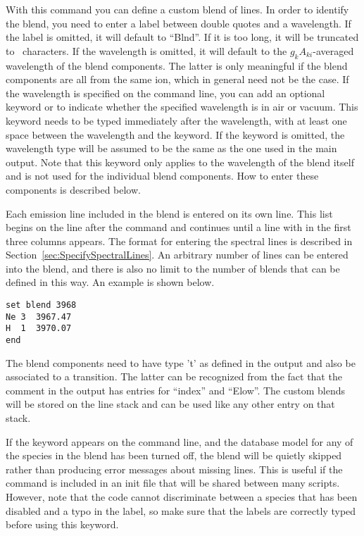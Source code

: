 With this command you can define a custom blend of lines. In order to identify
the blend, you need to enter a label between double quotes and a wavelength.
If the label is omitted, it will default to ``Blnd''. If it is too long, it
will be truncated to \LabelLenMax\ characters. If the wavelength is omitted,
it will default to the $g_k A_{ki}$-averaged wavelength of the blend
components. The latter is only meaningful if the blend components are all from
the same ion, which in general need not be the case. If the wavelength is
specified on the command line, you can add an optional keyword 
or  to indicate whether the specified wavelength is in air
or vacuum. This keyword needs to be typed immediately after the wavelength,
with at least one space between the wavelength and the keyword. If the keyword
is omitted, the wavelength type will be assumed to be the same as the one used
in the main output. Note that this keyword only applies to the wavelength of
the blend itself and is not used for the individual blend components. How to
enter these components is described below.

Each emission line included in the blend is entered on its own line. This list
begins on the line after the  command and continues until
a line with  in the first three columns appears. The format for
entering the spectral lines is described in
Section~\ref{sec:SpecifySpectralLines}. An arbitrary number of lines can be
entered into the blend, and there is also no limit to the number of blends
that can be defined in this way. An example is shown below.
\begin{verbatim}
set blend 3968
Ne 3  3967.47
H  1  3970.07
end
\end{verbatim}

The blend components need to have type 't' as defined in the  output and also be associated to a transition. The latter can
be recognized from the fact that the comment in the  output has entries for ``index'' and ``Elow''. The custom blends
will be stored on the line stack and can be used like any other entry on that
stack.

If the keyword  appears on the  command
line, and the database model for any of the species in the blend has been
turned off, the blend will be quietly skipped rather than producing error
messages about missing lines. This is useful if the 
command is included in an init file that will be shared between many scripts.
However, note that the code cannot discriminate between a species that has
been disabled and a typo in the label, so make sure that the labels are
correctly typed before using this keyword.

